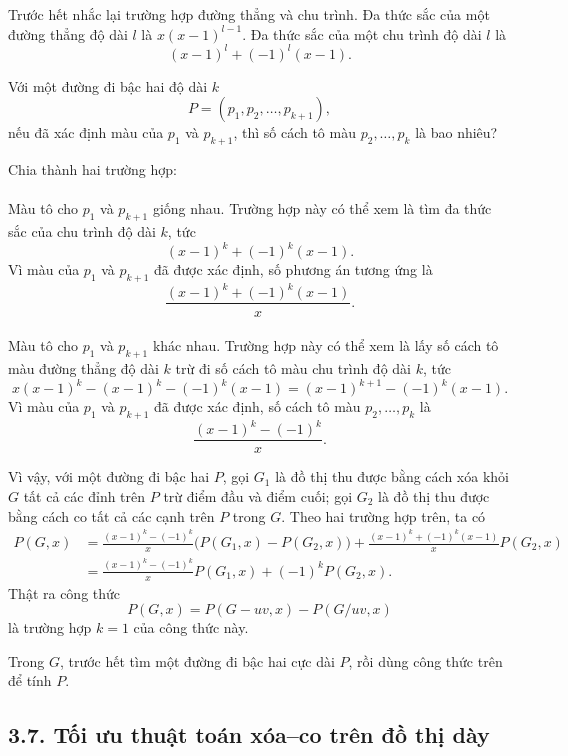 \documentclass[11pt]{article}
\begin{document}
Trước hết nhắc lại trường hợp đường thẳng và chu trình. Đa thức sắc của một
đường thẳng độ dài \(l\) là \(x(x-1)^{l-1}\). Đa thức sắc của một chu trình độ
dài \(l\) là
\[
  (x-1)^l+(-1)^l(x-1).
\]

Với một đường đi bậc hai độ dài \(k\)
\[
  P=(p_1,p_2,\ldots,p_{k+1}),
\]
nếu đã xác định màu của \(p_1\) và \(p_{k+1}\), thì số cách tô màu
\(p_2,\ldots,p_k\) là bao nhiêu?

Chia thành hai trường hợp:

\paragraph{}
Màu tô cho \(p_1\) và \(p_{k+1}\) giống nhau. Trường hợp này có thể xem là
tìm đa thức sắc của chu trình độ dài \(k\), tức
\[
  (x-1)^k+(-1)^k(x-1).
\]
Vì màu của \(p_1\) và \(p_{k+1}\) đã được xác định, số phương án tương ứng là
\[
  \frac{(x-1)^k+(-1)^k(x-1)}{x}.
\]

\paragraph{}
Màu tô cho \(p_1\) và \(p_{k+1}\) khác nhau. Trường hợp này có thể xem là lấy
số cách tô màu đường thẳng độ dài \(k\) trừ đi số cách tô màu chu trình độ dài
\(k\), tức
\[
  x(x-1)^k-(x-1)^k-(-1)^k(x-1)
  =(x-1)^{k+1}-(-1)^k(x-1).
\]
Vì màu của \(p_1\) và \(p_{k+1}\) đã được xác định, số cách tô màu
\(p_2,\ldots,p_k\) là
\[
  \frac{(x-1)^k-(-1)^k}{x}.
\]

Vì vậy, với một đường đi bậc hai \(P\), gọi \(G_1\) là đồ thị thu được bằng
cách xóa khỏi \(G\) tất cả các đỉnh trên \(P\) trừ điểm đầu và điểm cuối; gọi
\(G_2\) là đồ thị thu được bằng cách co tất cả các cạnh trên \(P\) trong
\(G\). Theo hai trường hợp trên, ta có
\[
\begin{aligned}
  P(G,x)
  &=\frac{(x-1)^k-(-1)^k}{x}\bigl(P(G_1,x)-P(G_2,x)\bigr)
    +\frac{(x-1)^k+(-1)^k(x-1)}{x}P(G_2,x)\\
  &=\frac{(x-1)^k-(-1)^k}{x}P(G_1,x)+(-1)^kP(G_2,x).
\end{aligned}
\]
Thật ra công thức
\[
  P(G,x)=P(G-uv,x)-P(G/uv,x)
\]
là trường hợp \(k=1\) của công thức này.

Trong \(G\), trước hết tìm một đường đi bậc hai cực dài \(P\), rồi dùng công
thức trên để tính \(P\).

\subsection*{3.7. Tối ưu thuật toán xóa--co trên đồ thị dày}
\end{document}
